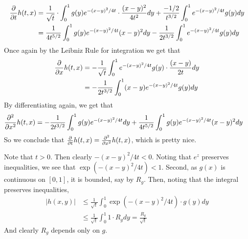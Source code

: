 \documentclass[12pt]{article}
\theoremstyle{definition}
\theoremstyle{remark}
\begin{document}
\begin{enumerate}[leftmargin=\labelsep]
		\begin{align*}
			\pdv{t} h(t, x) &= \frac{1}{\sqrt{t}} \cdot \int_0^1 g(y)e^{-(x-y)^2/4t} \cdot \frac{(x-y)^2}{4t^2}dy + \frac{-1/2}{t^{3/2}} \int_0^1 e^{-(x-y)^2/4t}g(y)dy \\
			&= \frac{1}{4t^{5/2}} \int_0^1 g(y)e^{-(x-y)^2/4t}(x-y)^2dy - \frac{1}{2t^{3/2}} \int_0^1 e^{-(x-y)^2/4t}g(y)dy
		\end{align*}
		Once again by the Leibniz Rule for integration we get that
		\begin{align*}
			\pdv{x} h(t, x) &= -\frac{1}{\sqrt{t}} \int_0^1 e^{-(x-y)^2/4t} g(y) \cdot \frac{(x-y)}{2t}dy \\
			&= -\frac{1}{2t^{3/2}} \int_0^1 (x-y)e^{-(x-y)^2/4t} g(y)dy
		\end{align*}
		By differentiating again, we get that
		\begin{align*}
			\pdv[2]{x} h(t, x) &= -\frac{1}{2t^{3/2}}\int_0^1 g(y)e^{-(x-y)^2/4t} dy + \frac{1}{4t^{5/2}}\int_0^1 g(y)e^{-(x-y)^2/4t} (x-y)^2dy
		\end{align*}
		So we conclude that $\pdv{t} h(t, x) = \pdv[2]{x} h(t, x)$, which is pretty nice.
		
		Note that $t > 0$. Then clearly $-(x-y)^2/4t < 0$. Noting that $e^z$ preserves inequalities, we see that $\exp(-(x-y)^2/4t) < 1$. Second, as $g(x)$ is continuous on $[0, 1]$, it is bounded, say by $R_g$. Then, noting that the integral preserves inequalities,
		\begin{align*}
			|h(x, y)| &\leq \frac{1}{\sqrt{t}} \int_0^1 \exp(-(x-y)^2/4t) \cdot g(y)dy \\
			&\leq \frac1{\sqrt{t}}\int_0^1 1 \cdot R_gdy = \frac{R_g}{\sqrt{t}}
		\end{align*}
		And clearly $R_g$ depends only on $g$. 
		

\end{enumerate}
\end{document}
